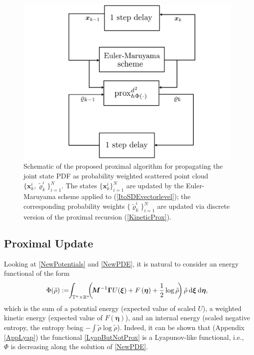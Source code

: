 \documentclass[10pt,twocolumn]{IEEEtran}
\newcommand{\differential}{{\rm{d}}}
\begin{document}
\begin{figure}[t]
\centering
\includegraphics[width=.8\linewidth]{BlockDiagm.pdf}
\caption{\small{Schematic of the proposed proximal algorithm for propagating the joint state PDF as probability weighted scattered point cloud $\{\bm{x}_{k}^{i},\tilde{\varrho}_{k}^{i}\}_{i=1}^{N}$. The states $\{\bm{x}_{k}^{i}\}_{i=1}^{N}$ are updated by the Euler-Maruyama scheme applied to (\ref{ItoSDEvectorlevel}); the corresponding probability weights $\{\tilde{\varrho}_{k}^{i}\}_{i=1}^{N}$ are updated via discrete version of the proximal recursion (\ref{KineticProx}).}}
\label{fig:BlockDiagm}
\end{figure}



\subsection{Proximal Update}\label{subsec:ProxUpdate}
Looking at \eqref{NewPotentials} and \eqref{NewPDE}, it is natural to consider an energy functional of the form
\begin{align}
\Phi(\tilde{\rho}) := \!\!\displaystyle\int_{\mathbb{T}^{n}\times\mathbb{R}^{n}}\!\!\!\left(\!\bm{M}^{-1}\bm{\Gamma}U(\bm{\xi})+ F\left(\bm{\eta}\right) + \frac{1}{2}\log\tilde{\rho}\!\right)\tilde{\rho}\:\differential\bm{\xi}\:\differential\bm{\eta},
\label{LyapButNotProx}	
\end{align}
which is the sum of a potential energy (expected value of scaled $U$), a weighted kinetic energy (expected value of $F\left(\bm{\eta}\right)$), and an internal energy (scaled negative entropy, the entropy being $-\int\tilde{\rho}\log\tilde{\rho}$). Indeed, it can be shown that (Appendix \ref{AppLyap}) the functional \eqref{LyapButNotProx} is a Lyapunov-like functional, i.e., $\Phi$ is decreasing along the solution of \eqref{NewPDE}.
\end{document}
